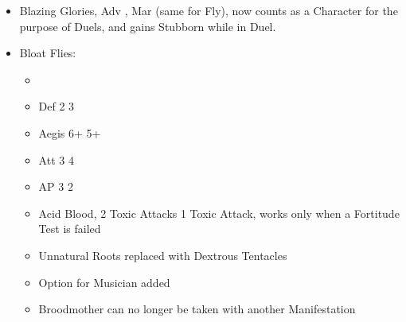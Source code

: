 \begin{itemize}
\item Blazing Glories, Adv  \goodup{} , Mar  \goodup{}  (same for Fly), now counts as a Character for the purpose of Duels, and gains Stubborn while in Duel.
\item Bloat Flies:
\begin{itemize}
\item {} \baddown{} 
\item Def 2 \goodup{} 3
\item Aegis 6+ \goodup{} 5+
\item Att 3 \goodup{} 4
\item AP 3 \baddown{} 2
\item Acid Blood, 2 Toxic Attacks \baddown{} 1 Toxic Attack, works only when a Fortitude Test is failed
\item Unnatural Roots replaced with Dextrous Tentacles
\item Option for Musician added
\item Broodmother can no longer be taken with another Manifestation
\end{itemize}
\end{itemize}

\subtitle{Balance changes}

